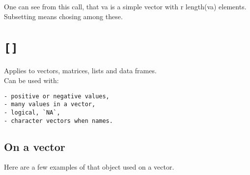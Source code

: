 \documentclass[]{book}
\theoremstyle{definition}
\theoremstyle{definition}
\theoremstyle{definition}
\theoremstyle{remark}
\begin{document}
One can see from this call, that va is a simple vector with r length(va)
elements. Subsetting means chosing among these.

\hypertarget{section}{%
\section{\texorpdfstring{\texttt{{[}{]}}}{{[}{]}}}\label{section}}

Applies to vectors, matrices, lists and data frames.\\
Can be used with:

\begin{verbatim}
- positive or negative values,
- many values in a vector,
- logical, `NA`,
- character vectors when names.
\end{verbatim}

\hypertarget{on-a-vector}{%
\subsection{On a vector}\label{on-a-vector}}

Here are a few examples of that object used on a vector.
\end{document}
